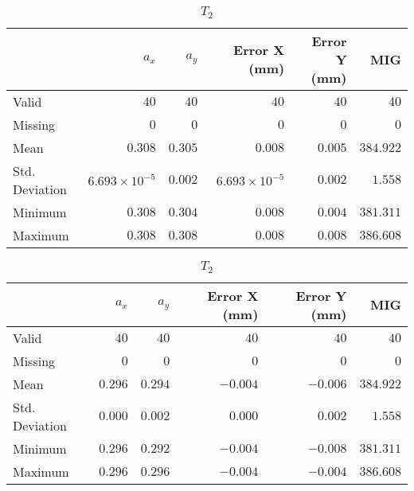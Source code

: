 \begin{table}[h]
    \centering
    \begin{subtable}{\textwidth}
        \centering
        \footnotesize
        \begin{tabular}{lrrrrr}
            \toprule
                & $a_x$ & $a_y$ & Error X (mm) & Error Y (mm) & MIG  \\
            \midrule
			Valid & $40$ & $40$ & $40$ & $40$ & $40$  \\
			Missing & $0$ & $0$ & $0$ & $0$ & $0$  \\
			Mean & $0.308$ & $0.305$ & $0.008$ & $0.005$ & $384.922$  \\
			Std. Deviation & $6.693\times10^{-5}$ & $0.002$ & $6.693\times10^{-5}$ & $0.002$ & $1.558$  \\
			Minimum & $0.308$ & $0.304$ & $0.008$ & $0.004$ & $381.311$  \\
			Maximum & $0.308$ & $0.308$ & $0.008$ & $0.008$ & $386.608$  \\
            \bottomrule
        \end{tabular}
        \caption{$T_1$}
    \end{subtable}
    
    \vspace{10pt} %
    
    \begin{subtable}{\textwidth}
        \centering
        \footnotesize
        \begin{tabular}{lrrrrr}
            \toprule
                & $a_x$ & $a_y$ & Error X (mm) & Error Y (mm) & MIG  \\
            \midrule
			Valid & $40$ & $40$ & $40$ & $40$ & $40$  \\
			Missing & $0$ & $0$ & $0$ & $0$ & $0$  \\
			Mean & $0.296$ & $0.294$ & $-0.004$ & $-0.006$ & $384.922$  \\
			Std. Deviation & $0.000$ & $0.002$ & $0.000$ & $0.002$ & $1.558$  \\
			Minimum & $0.296$ & $0.292$ & $-0.004$ & $-0.008$ & $381.311$  \\
			Maximum & $0.296$ & $0.296$ & $-0.004$ & $-0.004$ & $386.608$  \\
            \bottomrule
        \end{tabular}
        \caption{$T_2$}
    \end{subtable}

    \vspace{10pt} %
    

\end{table}
